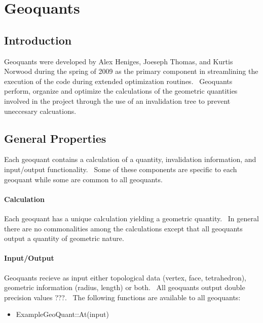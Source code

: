                       


\chapter{Geoquants}

\section{Introduction}

Geoquants were developed by Alex Heniges, Joeseph Thomas, and Kurtis Norwood
during the spring of 2009 as the primary component in streamlining the
execution of the code during extended optimization routines. \ Geoquants
perform, organize and optimize the calculations of the geometric quantities
involved in the project through the use of an invalidation tree to prevent
uneccesary calcuations.\bigskip

\section{General Properties}

Each geoquant contains a calculation of a quantity, invalidation
information, and input/output functionality. \ Some of these components are
specific to each geoquant while some are common to all geoquants.

\subsubsection{Calculation}

Each geoquant has a unique calculation yielding a geometric quantity. \ In
general there are no commonalities among the calculations except that all
geoquants output a quantity of geometric nature. \ 

\subsubsection{Input/Output}

Geoquants recieve as input either topological data (vertex, face,
tetrahedron), geometric information (radius, length) or both. \ All
geoquants output double precision values ???. \ The following functions are
available to all geoquants:

\begin{itemize}
\item ExampleGeoQuant::At(input)
\end{itemize}

